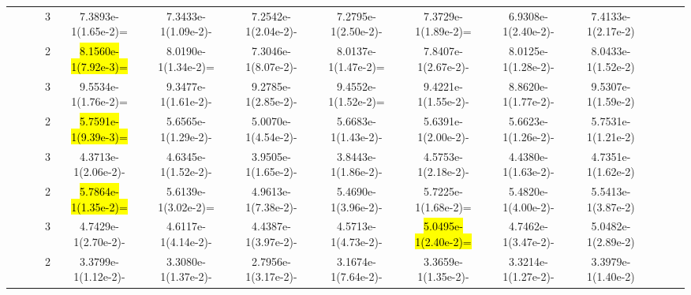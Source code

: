 \documentclass[a4paper,fleqn]{cas-dc}
\newcommand{\highlight}[1]{
	\begingroup
	\sethlcolor{Seashell}%
	\hl{#1}%
	\endgroup
}
\begin{document}
\begin{sloppypar}
\begin{table}[ht]
{\begin{tabular}{ccccccccccccc}
					\multirow{4}{*}{~}&\multirow{2}{*}{~}&3		&7.3893e-1(1.65e-2)=	&7.3433e-1(1.09e-2)-	&7.2542e-1(2.04e-2)-	&7.2795e-1(2.50e-2)-	&7.3729e-1(1.89e-2)=	&6.9308e-1(2.40e-2)-	&7.4133e-1(2.17e-2)\\
					
					
					
					\multirow{4}{*}{~}&\multirow{2}{*}{ZCAT2}&2	&\highlight{8.1560e-1(7.92e-3)=}	&8.0190e-1(1.34e-2)=	&7.3046e-1(8.07e-2)-	&8.0137e-1(1.47e-2)=	&7.8407e-1(2.67e-2)-	&8.0125e-1(1.28e-2)-	&8.0433e-1(1.52e-2)\\
					
					\multirow{4}{*}{~}&\multirow{2}{*}{~}&3  &9.5534e-1(1.76e-2)=	&9.3477e-1(1.61e-2)-	&9.2785e-1(2.85e-2)-	&9.4552e-1(1.52e-2)=	&9.4221e-1(1.55e-2)-	&8.8620e-1(1.77e-2)-	&9.5307e-1(1.59e-2)\\
					\hline
					
					
					
					
					
					
					\multirow{8}{*}{Partial}&\multirow{2}{*}{ZCAT3}&2 &\highlight{5.7591e-1(9.39e-3)=}	&5.6565e-1(1.29e-2)-	&5.0070e-1(4.54e-2)-	&5.6683e-1(1.43e-2)-	&5.6391e-1(2.00e-2)-	&5.6623e-1(1.26e-2)-	&5.7531e-1(1.21e-2)\\
					
					\multirow{8}{*}{~}&\multirow{2}{*}{~}&3		&4.3713e-1(2.06e-2)-	&4.6345e-1(1.52e-2)-	&3.9505e-1(1.65e-2)-	&3.8443e-1(1.86e-2)-	&4.5753e-1(2.18e-2)-	&4.4380e-1(1.63e-2)-	&4.7351e-1(1.62e-2)\\
					
					
					
					\multirow{8}{*}{~}&\multirow{2}{*}{ZCAT4}&2	 &\highlight{5.7864e-1(1.35e-2)=}		&5.6139e-1(3.02e-2)=	&4.9613e-1(7.38e-2)-	&5.4690e-1(3.96e-2)-	&5.7225e-1(1.68e-2)=	&5.4820e-1(4.00e-2)-	&5.5413e-1(3.87e-2)\\
					
					\multirow{8}{*}{~}&\multirow{2}{*}{~}&3	 &4.7429e-1(2.70e-2)-		&4.6117e-1(4.14e-2)-	&4.4387e-1(3.97e-2)-	&4.5713e-1(4.73e-2)-	&\highlight{5.0495e-1(2.40e-2)=}	&4.7462e-1(3.47e-2)-	&5.0482e-1(2.89e-2)\\
					
					
					
					\multirow{8}{*}{~}&\multirow{2}{*}{ZCAT8}&2		&3.3799e-1(1.12e-2)-	&3.3080e-1(1.37e-2)-	&2.7956e-1(3.17e-2)-	&3.1674e-1(7.64e-2)-	&3.3659e-1(1.35e-2)-	&3.3214e-1(1.27e-2)-	&3.3979e-1(1.40e-2)\\
					

\end{tabular}}
\end{table}
\end{sloppypar}
\end{document}
